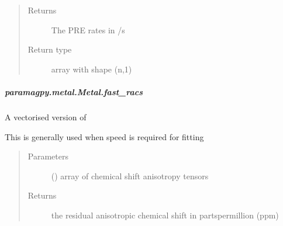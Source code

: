 \documentclass[a4paper,10pt,english,openany,oneside]{sphinxmanual}
\begin{document}
\begin{fulllineitems}
\begin{fulllineitems}
\begin{fulllineitems}
\begin{quote}
\begin{description}
\item[{Returns}] \leavevmode
\sphinxAtStartPar
{} \textendash{} The PRE rates in /s

\item[{Return type}] \leavevmode
\sphinxAtStartPar
array with shape (n,1)

\end{description}\end{quote}

\end{fulllineitems}



\subparagraph{paramagpy.metal.Metal.fast\_racs}
\label{\detokenize{reference/generated/paramagpy.metal.Metal.fast_racs:paramagpy-metal-metal-fast-racs}}\label{\detokenize{reference/generated/paramagpy.metal.Metal.fast_racs::doc}}

\begin{fulllineitems}
\label{\detokenize{reference/generated/paramagpy.metal.Metal.fast_racs:paramagpy.metal.Metal.fast_racs}}
\sphinxAtStartPar
A vectorised version of {\hyperref[\detokenize{reference/generated/paramagpy.metal.Metal.racs:paramagpy.metal.Metal.racs}]{}}

\sphinxAtStartPar
This is generally used when speed is required for fitting
\begin{quote}\begin{description}
\item[{Parameters}] \leavevmode
\sphinxAtStartPar
{} (\sphinxstyleliteralemphasis{\sphinxupquote{ (}}\sphinxstyleliteralemphasis{\sphinxupquote{,}}\sphinxstyleliteralemphasis{\sphinxupquote{,}}\sphinxstyleliteralemphasis{\sphinxupquote{)}}) \textendash{} array of chemical shift anisotropy tensors

\item[{Returns}] \leavevmode
\sphinxAtStartPar
{} \textendash{} the residual anisotropic chemical shift in parts\sphinxhyphen{}per\sphinxhyphen{}million (ppm)


\end{description}
\end{quote}
\end{fulllineitems}
\end{fulllineitems}
\end{fulllineitems}
\end{document}
